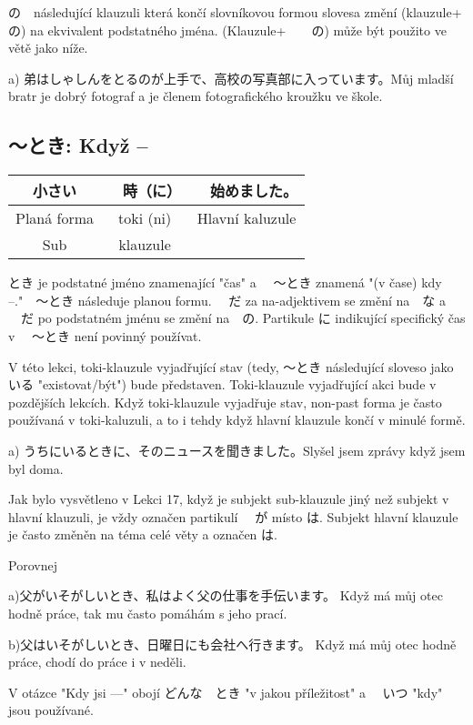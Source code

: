 の　následující klauzuli která končí slovníkovou formou slovesa změní (klauzule+　の) na ekvivalent podstatného jména. (Klauzule+　　の) může být použito ve větě jako níže.　

a) 弟はしゃしんをとるのが上手で、高校の写真部に入っています。Můj mladší bratr je dobrý fotograf a je členem fotografického kroužku ve škole.



\subsection{〜とき: Když --}
\begin{center}
\begin{tabular}{||c|c||c||}
\hline
小さい　&　時（に）&　始めました。\\
\hline
Planá forma & toki (ni)& Hlavní kaluzule\\
Sub& klauzule&\\
\hline
\end{tabular}
\end{center}

とき je podstatné jméno znamenající "čas" a 　〜とき znamená "(v čase) kdy --."　〜とき následuje planou formu. 　だ za na-adjektivem se změní na　な a 　だ po podstatném jménu se změní na　の. Partikule に indikující specifický čas  v 　〜とき není povinný používat.

V této lekci, toki-klauzule vyjadřující stav (tedy, 〜とき následující sloveso jako　いる "existovat/být") bude představen. Toki-klauzule vyjadřující akci bude v pozdějších lekcích. Když toki-klauzule vyjadřuje stav, non-past forma je často používaná v toki-kaluzuli, a to i tehdy když hlavní klauzule končí v minulé formě.

a) うちにいるときに、そのニュースを聞きました。Slyšel jsem zprávy když jsem byl doma.

Jak bylo vysvětleno v Lekci 17, když je subjekt sub-klauzule jiný než subjekt v hlavní klauzuli, je vždy označen partikulí 　が	místo 	は. Subjekt hlavní klauzule je často změněn na téma celé věty a označen 	は.

Porovnej 

a)父がいそがしいとき、私はよく父の仕事を手伝います。 Když má můj otec hodně práce, tak mu často pomáhám s jeho prací.

b)父はいそがしいとき、日曜日にも会社へ行きます。 Když má můj otec hodně práce, chodí do práce i v neděli.


V otázce "Kdy jsi ---" obojí	どんな　とき	"v jakou příležitost" a 　いつ	"kdy" jsou používané.

